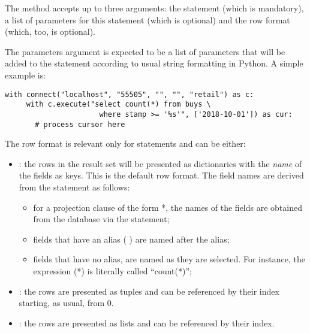 The  method accepts up to three arguments:
the statement (which is mandatory), a list of parameters for this
statement (which is optional) and the row format (which, too,
is optional).

The parameters argument is expected to be a list of parameters
that will be added to the statement according
to usual string formatting in Python.
A simple example is:

\begin{python}
\begin{lstlisting}
with connect("localhost", "55505", "", "", "retail") as c:
     with c.execute("select count(*) from buys \
                      where stamp >= '%s'", ['2018-10-01']) as cur:
       # process cursor here
\end{lstlisting}
\end{python}

The row format is relevant only for 
statements and can be either:

\begin{itemize}
\item {}: 
      the rows in the result set will be presented as dictionaries
      with the \emph{name} of the fields as keys.
      This is the default row format.
      The field names are derived from the statement as follows:
      \begin{itemize}
      \item for a projection clause of the form  *,
            the names of the fields are obtained from the database via
            the \term{describe} statement;
      \item fields that have an alias
            (   )
            are named after the alias;
      \item fields that have no alias, are named as they are selected.
            For instance, the expression \keyword{count}(*) is
            literally called ``count(*)''; 
      \end{itemize}
\item {}:
      the rows are presented as tuples and can be referenced by their index
      starting, as usual, from 0.
\item {}:
      the rows are presented as lists and can be referenced by their index.
\end{itemize}

